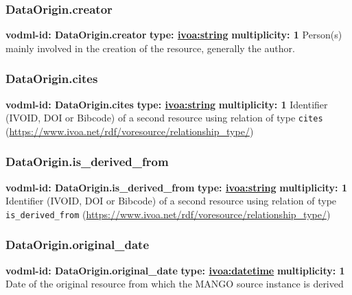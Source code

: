     \subsubsection{DataOrigin.creator}
      \textbf{vodml-id: DataOrigin.creator} \newline
      \textbf{type: \hyperref[sect:ivoa]{ivoa:string}} \newline
      \textbf{multiplicity: 1} \newline 
      Person(s) mainly involved in the creation of the resource, generally the author.

    \subsubsection{DataOrigin.cites}
      \textbf{vodml-id: DataOrigin.cites} \newline
      \textbf{type: \hyperref[sect:ivoa]{ivoa:string}} \newline
      \textbf{multiplicity: 1} \newline 
      Identifier (IVOID, DOI or Bibcode) of a second resource using relation of type \texttt{cites} (\url{https://www.ivoa.net/rdf/voresource/relationship\_type/})

    \subsubsection{DataOrigin.is_derived_from}
      \textbf{vodml-id: DataOrigin.is_derived_from} \newline
      \textbf{type: \hyperref[sect:ivoa]{ivoa:string}} \newline
      \textbf{multiplicity: 1} \newline 
      Identifier (IVOID, DOI or Bibcode) of a second resource using relation of type \texttt{is\_derived\_from} (\url{https://www.ivoa.net/rdf/voresource/relationship\_type/})

    \subsubsection{DataOrigin.original_date}
      \textbf{vodml-id: DataOrigin.original_date} \newline
      \textbf{type: \hyperref[sect:ivoa]{ivoa:datetime}} \newline
      \textbf{multiplicity: 1} \newline 
      Date of the original resource from which the MANGO source instance is derived

